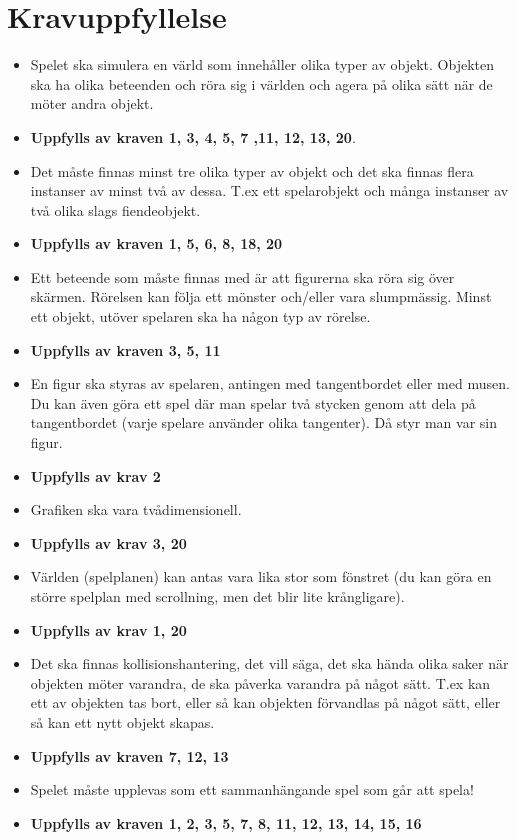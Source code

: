 \documentclass{TDP003mall}
\begin{document}
\newpage

\section{Kravuppfyllelse}
\begin{itemize}
\item Spelet ska simulera en värld som innehåller olika typer av objekt. Objekten ska ha olika beteenden och röra sig i världen och agera på olika sätt när de möter andra objekt.
\item[] \textbf{Uppfylls av kraven 1, 3, 4, 5, 7 ,11, 12, 13, 20}.

\item Det måste finnas minst tre olika typer av objekt och det ska finnas flera instanser av minst två av dessa. T.ex ett spelarobjekt och många instanser av två olika slags fiendeobjekt.
\item[] \textbf{Uppfylls av kraven 1, 5, 6, 8, 18, 20}

\item Ett beteende som måste finnas med är att figurerna ska röra sig över skärmen. Rörelsen kan följa ett mönster och/eller vara slumpmässig. Minst ett objekt, utöver spelaren ska ha någon typ av rörelse. 
\item[] \textbf{Uppfylls av kraven 3, 5, 11}

\item En figur ska styras av spelaren, antingen med tangentbordet eller med musen. Du kan även göra ett spel där man spelar två stycken genom att dela på tangentbordet (varje spelare använder olika tangenter). Då styr man var sin figur. 
\item[] \textbf{Uppfylls av krav 2}

\item Grafiken ska vara tvådimensionell. 
\item[] \textbf{Uppfylls av krav 3, 20}

\item Världen (spelplanen) kan antas vara lika stor som fönstret (du kan göra en större spelplan med scrollning, men det blir lite krångligare). 
\item[] \textbf{Uppfylls av krav 1, 20}

\item Det ska finnas kollisionshantering, det vill säga, det ska hända olika saker när objekten möter varandra, de ska påverka varandra på något sätt. T.ex kan ett av objekten tas bort, eller så kan objekten förvandlas på något sätt, eller så kan ett nytt objekt skapas.
\item[] \textbf{Uppfylls av kraven 7, 12, 13}

\item Spelet måste upplevas som ett sammanhängande spel som går att spela! 
\item[] \textbf{Uppfylls av kraven 1, 2, 3, 5, 7, 8, 11, 12, 13, 14, 15, 16}
\end{itemize}
\end{document}
